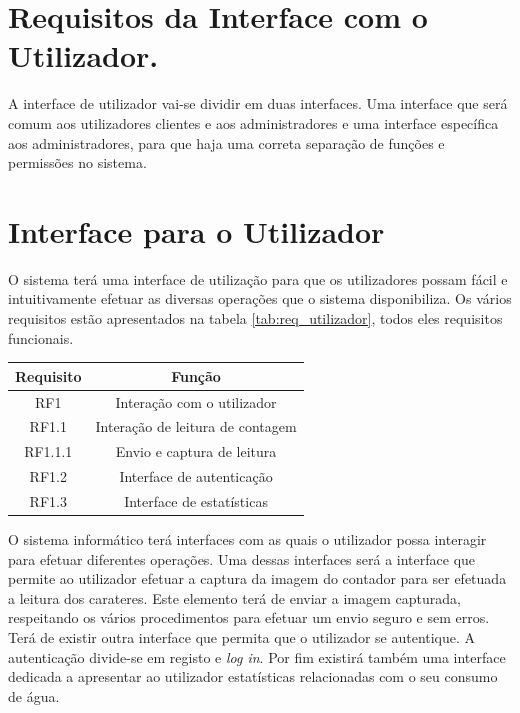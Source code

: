 \section{Requisitos da Interface com o Utilizador.} \label{sec:req_ut}
A interface de utilizador vai-se dividir em duas interfaces. Uma interface que será comum aos utilizadores clientes e aos administradores e uma interface específica aos administradores, para que haja uma correta separação de funções e permissões no sistema. 

\section{Interface para o Utilizador} \label{sec:req_ut2}
O sistema terá uma interface de utilização para que os utilizadores possam fácil e intuitivamente efetuar as diversas operações que o sistema disponibiliza. Os vários requisitos estão apresentados na tabela \ref{tab:req_utilizador}, todos eles requisitos funcionais.

\begin{center}
\begin{tabular}[c]{c  c }  %
\hline
Requisito & Função\\
\hline
RF1 & Interação com o utilizador\\ 

RF1.1 & Interação de leitura de contagem\\

RF1.1.1 & Envio e captura de leitura\\

RF1.2 & Interface de autenticação\\

RF1.3 & Interface de estatísticas\\
\hline
\end{tabular}
\label{tab:req_utilizador}
\end{center}
\vspace{8mm} %

O sistema informático terá interfaces com as quais o utilizador possa interagir para efetuar diferentes operações. Uma dessas interfaces será a interface que permite ao utilizador efetuar a captura da imagem do contador para ser efetuada a leitura dos carateres. Este elemento terá de enviar a imagem capturada, respeitando os vários procedimentos para efetuar um envio seguro e sem erros.\\
Terá de existir outra interface que permita que o utilizador se autentique. A autenticação divide-se em registo e {\textit{log in}}. Por fim existirá também uma interface dedicada a apresentar ao utilizador estatísticas relacionadas com o seu consumo de água.


